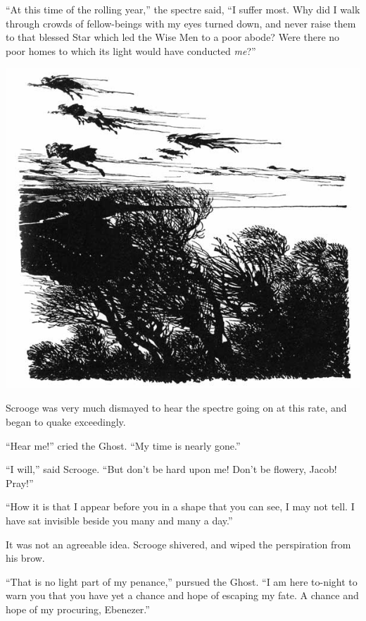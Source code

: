 \documentclass[paper=5.5in:8.5in,BCOR=15mm,twoside,DIV=15,headinclude=off,12pt,chapterprefix=off,openany,headings=huge]{scrbook} %
\begin{document}
\enquote{At this time of the rolling year,} the spectre said, \enquote{I suffer most. Why did I walk through crowds of fellow-beings with my eyes turned down, and never raise them to that blessed Star which led the Wise Men to a poor abode? Were there no poor homes to which its light would have conducted \textit{me}?}
 \begin{center}
     \vfill%
     \includegraphics[width=\columnwidth]{gs045b}
 \end{center}
\clearpage




Scrooge was very much dismayed to hear the spectre going on at this rate, and began to quake exceedingly.

\enquote{Hear me!} cried the Ghost. \enquote{My time is nearly gone.}

\enquote{I will,} said Scrooge. \enquote{But don't be hard upon me! Don't be flowery, Jacob! Pray!}

\enquote{How it is that I appear before you in a shape that you can see, I may not tell. I have sat invisible beside you many and many a day.}

It was not an agreeable idea. Scrooge shivered, and wiped the perspiration from his brow.

\enquote{That is no light part of my penance,} pursued the Ghost. \enquote{I am here to-night to warn you that you have yet a chance and hope of escaping my fate. A chance and hope of my procuring, Ebenezer.}
\end{document}
